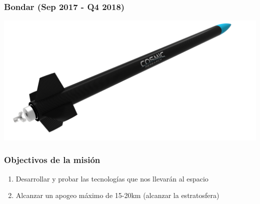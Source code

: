 \documentclass[numfooter]{beamer}
\begin{document}
    \begin{frame}
        \frametitle{Bondar (Sep 2017 - Q4 2018)}
        \includegraphics[width=\textwidth]{images/render.png}
    \end{frame}

    \begin{frame}
        \frametitle{Objectivos de la misión}
        \begin{enumerate}
            \item Desarrollar y probar las tecnologías que nos llevarán al espacio
            \item Alcanzar un apogeo máximo de 15-20km (alcanzar la estratosfera)
        \end{enumerate}
    \end{frame}
\end{document}

